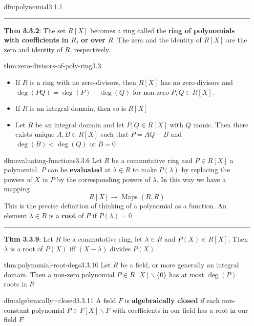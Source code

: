 \documentclass[landscape, 8pt]{extarticle}
\DeclareMathOperator{\Maps}{Maps}
\begin{document}
\begin{multicols}{3}
\begin{dfn}[Polynomial]{dfn:polynomial}{3.1.1}
    \vspace{-5pt}
    \noindent\rule{\textwidth}{0.2pt}
    \textbf{Thm 3.3.2}: The set $R[X]$ becomes a ring called the \textbf{ring of polynomials with coefficients in $R$, or over $R$}. The zero and the identity of $R[X]$ are the zero and identity of $R$, respectively.
\end{dfn}

\begin{thm}{thm:zero-divisors-of-poly-ring}{3.3}
    \begin{itemize}
        \setlength\itemsep{0em}
        \item[\textbf{3.3.3}:] If $R$ is a ring with no zero-divisors, then $R[X]$ has no zero-divisors and $\deg(PQ) = \deg(P) + \deg(Q)$ for non-zero $P,Q\in R[X]$.
        \item If $R$ is an integral domain, then so is $R[X]$
        \item[\textbf{3.3.4}:] Let $R$ be an integral domain and let $P, Q\in R[X]$ with $Q$ monic. Then there exists unique $A,B\in R[X]$ such that $P = AQ + B$ and $\deg(B) < \deg(Q)$ or $B = 0$
    \end{itemize}
\end{thm}

\begin{dfn}{dfn:evaluating-functions}{3.3.6}
    Let $R$ be a commutative ring and $P\in R[X]$ a polynomial. $P$ can be \textbf{evaluated} at $\lambda\in R$ to make $P(\lambda)$ by replacing the powers of $X$ in $P$ by the corresponding powers of $\lambda$. In this way we have a mapping
    \[R[X] \to \Maps(R, R)\]
    This is the precise definition of thinking of a polynomial as a function. An element $\lambda\in R$ is a \textbf{root} of $P$ if $P(\lambda) = 0$

    \noindent\rule{\textwidth}{0.2pt}
    \textbf{Thm 3.3.9}: Let $R$ be a commutative ring, let $\lambda\in R$ and $P(X)\in R[X]$. Then $\lambda$ is a root of $P(X)$ iff $(X - \lambda)$ divides $P(X)$
\end{dfn}

\begin{thm}{thm:polynomial-root-degs}{3.3.10}
    Let $R$ be a field, or more generally an integral domain. Then a non-zero polynomial $P\in R[X] \backslash \{0\}$ has at most $\deg(P)$ roots in $R$
\end{thm}

\begin{dfn}{dfn:algebraically=closed}{3.3.11}
    A field $F$ is \textbf{algebraically closed} if each non-constant polynomial $P\in F[X]\backslash F$ with coefficients in our field has a root in our field $F$


\end{dfn}
\end{multicols}
\end{document}
